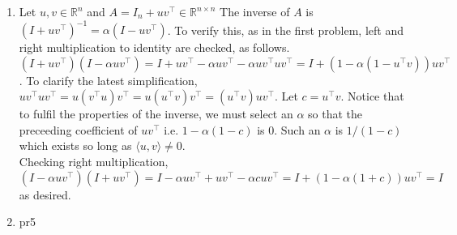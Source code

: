 \documentclass[12pt,fleqn,leqno,letterpaper]{article}
\begin{document}
\begin{enumerate}
    \item Let $u,v\in\mathbb{R}^n$ and $A=I_n+uv^\top\in\mathbb{R}^{n\times n}$
        The inverse of $A$ is $(I+uv^\top)^{-1} = \alpha(I-uv^\top)$. To verify
        this, as in the first problem, left and right multiplication to identity
        are checked, as follows.\\
        $(I+uv^\top)(I-\alpha uv^\top) =
        I + uv^\top - \alpha uv^\top - \alpha uv^\top uv^\top =
        I + (1 - \alpha(1 - u^\top v)) uv^\top$.
        To clarify the latest simplification,
        $uv^\top uv^\top = u(v^\top u)v^\top = u(u^\top v)v^\top =
        (u^\top v) uv^\top$. Let $c=u^\top v$.
        Notice that to fulfil the properties of the inverse, we must select an
        $\alpha$ so that the preceeding coefficient of $uv^\top$ i.e.
        $1-\alpha(1-c)$ is $0$. Such an $\alpha$ is
        $1/(1-c)$ which exists so long as $\langle u, v \rangle \neq
        0$.\\
        Checking right multiplication,
        $(I-\alpha uv^\top)(I+uv^\top) =
        I - \alpha uv^\top + uv^\top - \alpha c uv^\top =
        I + (1 - \alpha(1+c))uv^\top = I$ as desired.

    \item pr5
\end{enumerate}


% 
\end{document}
